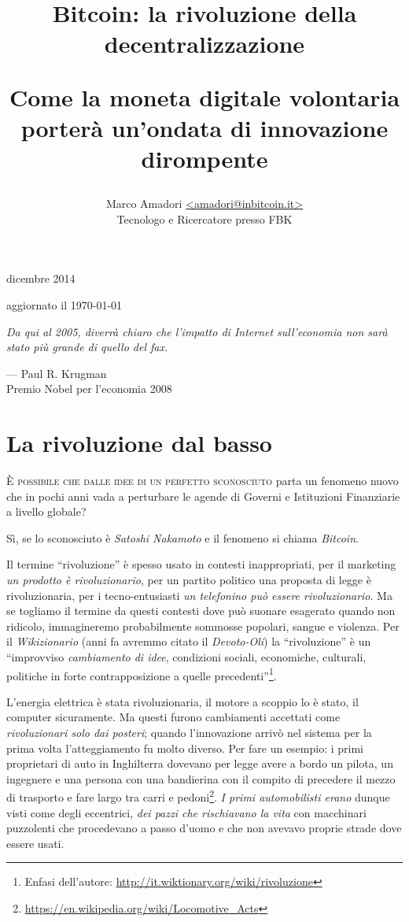 \documentclass[a4paper,12pt,italian]{article}
\title{\textbf{Bitcoin: la rivoluzione della decentralizzazione} \\ 
  \bigskip
  \begin{Large}Come la moneta digitale volontaria 
  porterà un’ondata di innovazione dirompente
  \end{Large}
}
\date{\vspace{-5ex}}
\author{\vspace{-5ex}}
\author{\begin{small}Marco Amadori \href{mailto:amadori@inbitcoin.it}{<amadori@inbitcoin.it>} \\ 
Tecnologo e Ricercatore presso FBK
\end{small}}
\makeatletter
\renewcommand\maketitle{
\newpage\thispagestyle{empty}
    \begin{center}
        {\huge\@title\par}
        \bigskip
        {\ttfamily 4 dicembre 2014\par
        aggiornato il \today{}\par}
    \end{center}
}
\makeatother
\begin{document}
\maketitle

\epigraph{\textit{Da qui al 2005, diverrà chiaro che l’impatto di Internet sull’economia
non sarà stato più grande di quello del fax.}\footnotemark}{ --- Paul R. Krugman \\ 
Premio Nobel per l’economia 2008}


\section*{La rivoluzione dal basso}

\lettrine{È}{ possibile che dalle idee di un perfetto sconosciuto} parta un fenomeno
nuovo che in pochi anni vada a perturbare le agende di Governi e
Istituzioni Finanziarie a livello globale?

\bigskip

Sì, se lo sconosciuto è \emph{Satoshi Nakamoto} e il fenomeno si chiama
\emph{Bitcoin}.

\bigskip

Il termine “rivoluzione” è spesso usato in contesti inappropriati, per
il marketing \emph{un prodotto è rivoluzionario}, per un partito politico una
proposta di legge è rivoluzionaria, per i tecno-entusiasti \emph{un
telefonino può essere rivoluzionario}. Ma se togliamo il termine da
questi contesti dove può suonare esagerato quando non ridicolo,
immagineremo probabilmente sommosse popolari, sangue e violenza. Per il
\emph{Wikizionario} (anni fa avremmo citato il \emph{Devoto-Oli}) la “rivoluzione” è
un “improvviso \emph{cambiamento di idee}, condizioni sociali, economiche,
culturali, politiche in forte contrapposizione a quelle
precedenti”\footnote{Enfasi dell'autore: \url{http://it.wiktionary.org/wiki/rivoluzione}}.

\bigskip

L’energia elettrica è stata rivoluzionaria, il motore a scoppio lo è
stato, il computer sicuramente. Ma questi furono cambiamenti accettati
come \emph{rivoluzionari solo dai posteri}; quando l’innovazione arrivò nel
sistema per la prima volta l’atteggiamento fu molto diverso. Per fare
un esempio: i primi proprietari di auto in Inghilterra dovevano per
legge avere a bordo un pilota, un ingegnere e una persona con una
bandierina con il compito di precedere il mezzo di trasporto e fare largo tra
carri e pedoni\footnote{\url{https://en.wikipedia.org/wiki/Locomotive_Acts}}.
\emph{I primi automobilisti erano} dunque visti come degli
eccentrici, \emph{dei pazzi che rischiavano la vita} con macchinari puzzolenti
che procedevano a passo d’uomo e che non avevavo proprie strade dove
essere usati.
\end{document}
